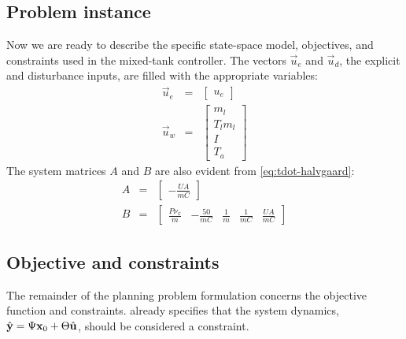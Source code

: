 \subsection{Problem instance}

Now we are ready to describe the specific state-space model, objectives, and constraints used in the mixed-tank controller.
The vectors $\vec{u}_e$ and $\vec{u}_d$, the explicit and disturbance inputs, are filled with the appropriate variables:
\begin{eqnarray}
   \vec{u}_e &=& \left[\begin{array}{c}
		u_e
	\end{array} \right]
	\\
   \vec{u}_w &=& \left[\begin{array}{cccc}
		m_l \\ T_l m_l \\ I \\ T_a
	\end{array} \right]
\end{eqnarray}
The system matrices $A$ and $B$ are also evident from \autoref{eq:tdot-halvgaard}:
\begin{eqnarray}
	A &=& \left[\begin{array}{c}
		-\frac{UA}{mC}
	\end{array} \right]
	\\
	B &=& \left[\begin{array}{ccccc}
		\frac{P \nu_x}{m} &
		-\frac{50}{mC} &
		\frac{1}{m} &
		\frac{1}{mC} &
		\frac{UA}{mC}
	\end{array} \right]
\end{eqnarray}

\subsection{Objective and constraints}

The remainder of the planning problem formulation concerns the objective function and constraints.
 already specifies that the system dynamics, $\hat{\mathbf{y}} = \Psi \mathbf{x}_0 + \Theta \hat{\mathbf{u}}$, should be considered a constraint.


